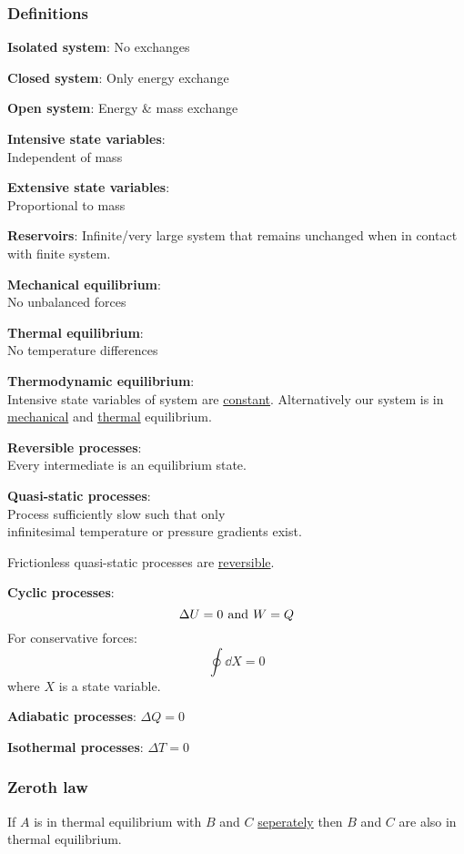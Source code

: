 \documentclass{article}
\begin{document}
\begin{multicols*}{3}
\noindent

\subsubsection*{Definitions}

\textbf{Isolated system}: No exchanges

\textbf{Closed system}: Only energy exchange

\textbf{Open system}: Energy \& mass exchange

\textbf{Intensive state variables}: \\
Independent of mass

\textbf{Extensive state variables}: \\
Proportional to mass

\textbf{Reservoirs}: Infinite/very large system
that remains unchanged when in contact
with finite system.

\textbf{Mechanical equilibrium}: \\
No unbalanced forces

\textbf{Thermal equilibrium}: \\
No temperature differences

\textbf{Thermodynamic equilibrium}: \\
Intensive state variables of system are \underline{constant}.
Alternatively our system is in \underline{mechanical} and
\underline{thermal} equilibrium.

\textbf{Reversible processes}: \\
Every intermediate is an equilibrium state.

\textbf{Quasi-static processes}: \\
Process sufficiently slow such that only \\
infinitesimal temperature or pressure gradients exist.

Frictionless quasi-static processes are \underline{reversible}.

\textbf{Cyclic processes}:
$$\Delta U=0
\hspace{0.05in}\text{and}\hspace{0.05in}
W=Q$$
For conservative forces:
$$\oint\dd X=0$$
where $X$ is a state variable.

\textbf{Adiabatic processes}: $\Delta Q=0$

\textbf{Isothermal processes}: $\Delta T=0$

\subsubsection*{Zeroth law}
If $A$ is in thermal equilibrium with $B$ and $C$
\underline{seperately} then $B$ and $C$
are also in thermal equilibrium.


\end{multicols*}
\end{document}
